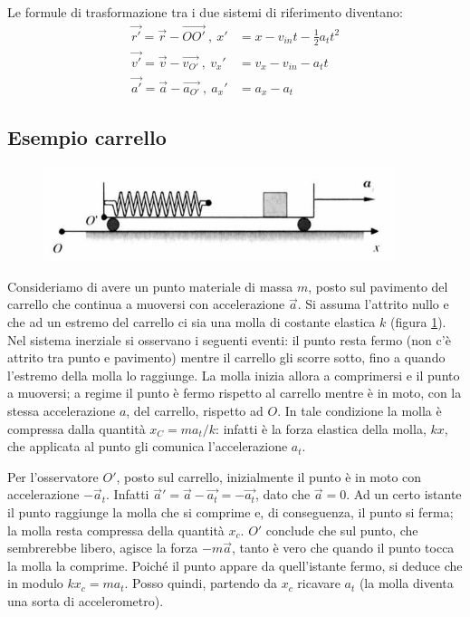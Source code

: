 \documentclass[class=book, crop=false, oneside, 12pt]{standalone}
\begin{document}
Le formule di trasformazione tra i due sistemi di riferimento diventano:
\begin{align*}
    \overrightarrow{r'} = \overrightarrow{r} - \overrightarrow{OO'} \ , \ x' & = x - v_{in} t - \frac{1}{2} a_t t^2 \\
    \overrightarrow{v'} = \overrightarrow{v} - \overrightarrow{v_{O'}} \ , \ v_x' & = v_x -v_{in} - a_t t \\
    \overrightarrow{a'} = \overrightarrow{a} - \overrightarrow{a_{O'}} \ , \ a_x' & = a_x - a_t 
\end{align*}

\subsection{Esempio carrello}

\begin{figure}[h]
    \includegraphics[scale=0.8]{carrello}
    \centering
    \caption{}
    \label{carrello}
\end{figure}

Consideriamo di avere un punto materiale di massa \(m\), posto sul pavimento del carrello che continua a muoversi con accelerazione \(\overrightarrow{a}\). 
Si assuma l'attrito nullo e che ad un estremo del carrello ci sia una molla di costante elastica \(k\) (figura \ref{carrello}).
Nel sistema inerziale si osservano i seguenti eventi: il punto resta fermo (non c'è attrito tra punto e pavimento) mentre il carrello gli scorre sotto, fino a quando l'estremo della molla lo raggiunge. 
La molla inizia allora a comprimersi e il punto a muoversi; a regime il punto è fermo rispetto al carrello mentre è in moto, con la stessa accelerazione \(a\), del carrello, rispetto ad \(O\). 
In tale condizione la molla è compressa dalla quantità \(x_C = m a_t / k\): infatti è la forza elastica della molla, \(k x\), che applicata al punto gli comunica l'accelerazione \(a_t\).

Per l'osservatore \(O'\), posto sul carrello, inizialmente il punto è in moto con accelerazione \(-\overrightarrow{a}_{t}\). 
Infatti \(\overrightarrow{a}' = \overrightarrow{a} -\overrightarrow{a_t}= -\overrightarrow{a_t} \), dato che \(\overrightarrow{a} = 0\). 
Ad un certo istante il punto raggiunge la molla che si comprime e, di conseguenza, il punto si ferma; la molla resta compressa della quantità \(x_c\). 
\(O'\) conclude che sul punto, che sembrerebbe libero, agisce la forza \(-m \overrightarrow{a}\), tanto è vero che quando il punto tocca la molla la comprime. 
Poiché il punto appare da quell'istante fermo, si deduce che in modulo \(k x_c = m a_t\). 
Posso quindi, partendo da \(x_c\) ricavare \(a_t\) (la molla diventa una sorta di accelerometro).
\end{document}
